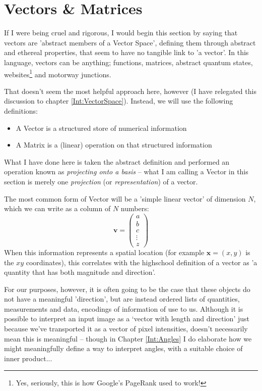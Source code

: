 \documentclass[a4paper,openany,11pt]{book}
\renewcommand\vec[1]{\boldsymbol{\mathbf{#1}}}
\begin{document}
				

						
		
				
		\chapter{Vectors \& Matrices}

			If I were being cruel and rigorous, I would begin this section by saying that vectors are 'abstract members of a Vector Space', defining them through abstract and ethereal properties, that seem to have no tangible link to 'a vector'. In this language, vectors can be anything; functions, matrices, abstract quantum states, websites\footnote{Yes, seriously, this is how Google's PageRank used to work!} and motorway junctions. 

			That doesn't seem the most helpful approach here, however (I have relegated this discussion to chapter \ref{Int:VectorSpace}). Instead, we will use the following definitions:
			\begin{itemize}
				\item A Vector is a structured store of numerical information
				\item A Matrix is a (linear) operation on that structured information
			\end{itemize}

			What I have done here is taken the abstract definition and performed an operation known as \textit{projecting onto a basis} -- what I am calling a Vector in this section is merely one \textit{projection} (or \textit{representation}) of a vector.

			The most common form of Vector will be a 'simple linear vector' of dimension $N$, which we can write as a column of $N$ numbers:
			\begin{equation}
				\vec{v} = \begin{pmatrix}
					a \\ b \\ c \\ \vdots \\ z
				\end{pmatrix}
			\end{equation}
			When this information represents a spatial location (for example $\vec{x} = (x,y)$ is the $xy$ coordinates), this correlates with the highschool definition of a vector as 'a quantity that has both magnitude and direction'.
			
			For our purposes, however, it is often going to be the case that these objects do not have a meaningful 'direction', but are instead ordered lists of quantities, measurements and data, encodings of information of use to us. Although it is possible to interpret an input image as a `vector with length and direction' just because we've transported it as a vector of pixel intensities, doesn't necessarily mean this is meaningful -- though in Chapter \ref{Int:Angles} I do elaborate how we might meaningfully define a way to interpret angles, with a suitable choice of inner product...
			
\end{document}
